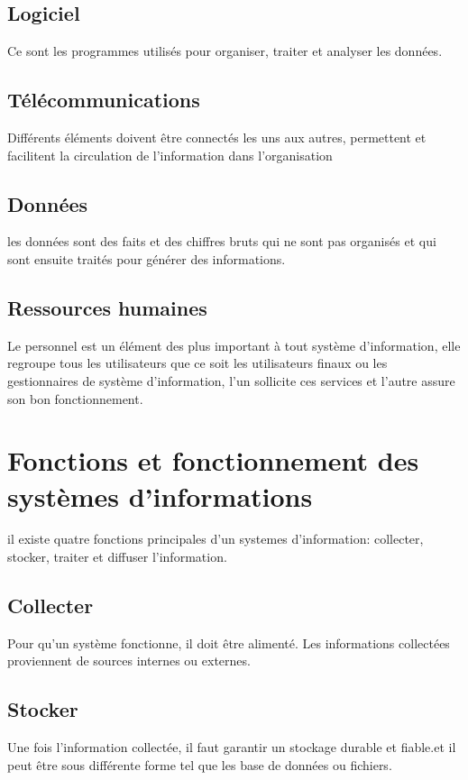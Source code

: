 \subsection{Logiciel }
\par Ce sont les programmes utilisés pour organiser, traiter et analyser les
données.

\subsection{Télécommunications }
\par Différents éléments doivent être connectés les uns aux autres, permettent
et facilitent la circulation de l’information dans l’organisation

\subsection{Données }
\par les données sont des faits et des chiffres bruts qui ne sont pas organisés
et qui sont ensuite traités pour générer des informations.

\subsection{Ressources humaines }
\par Le personnel est un élément des plus important à tout système
d’information, elle regroupe tous les utilisateurs que ce soit les utilisateurs
finaux ou les gestionnaires de système d’information, l’un sollicite ces
services et l’autre assure son bon fonctionnement.

\section{Fonctions et fonctionnement des systèmes d’informations }
\par il existe quatre fonctions principales d'un systemes d'information:
collecter, stocker, traiter et diffuser l’information.

\subsection{Collecter }
\par Pour qu'un système fonctionne, il doit être alimenté. Les informations
collectées proviennent de sources internes ou externes. 

\subsection{Stocker }
\par Une fois l’information collectée, il faut garantir un stockage durable et
fiable.et il peut être sous différente forme tel que les base de données ou
fichiers.

